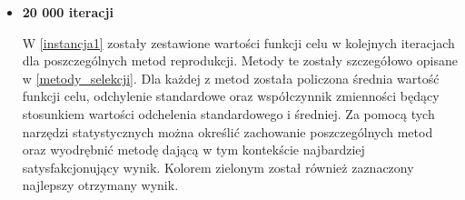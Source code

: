 \begin{itemize}
\item  \textbf{20 000 iteracji}\\
\par
 W \ref{instancja1} zostały zestawione wartości funkcji celu w kolejnych iteracjach dla poszczególnych metod reprodukcji. Metody te zostały szczegółowo opisane w \ref{metody_selekcji}. Dla każdej z metod została policzona średnia wartość funkcji celu, odchylenie standardowe oraz współczynnik zmienności będący stosunkiem wartości odchelenia standardowego i średniej. Za pomocą tych narzędzi statystycznych można określić zachowanie poszczególnych metod oraz wyodrębnić metodę dającą w tym kontekście najbardziej satysfakcjonujący wynik. Kolorem zielonym został również zaznaczony najlepszy otrzymany wynik.\\
\par
\begin{table}[h!]
\begin{center}
\end{center}
\end{table}
\end{itemize}
